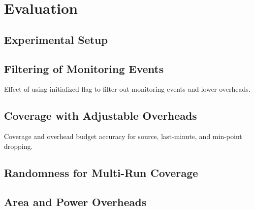 \section{Evaluation}
\label{sec:evaluation}

\subsection{Experimental Setup}

\subsection{Filtering of Monitoring Events}

Effect of using initialized flag to filter out monitoring events and lower overheads.

\subsection{Coverage with Adjustable Overheads}
Coverage and overhead budget accuracy for source, last-minute, and min-point dropping.

\subsection{Randomness for Multi-Run Coverage}

\subsection{Area and Power Overheads}


